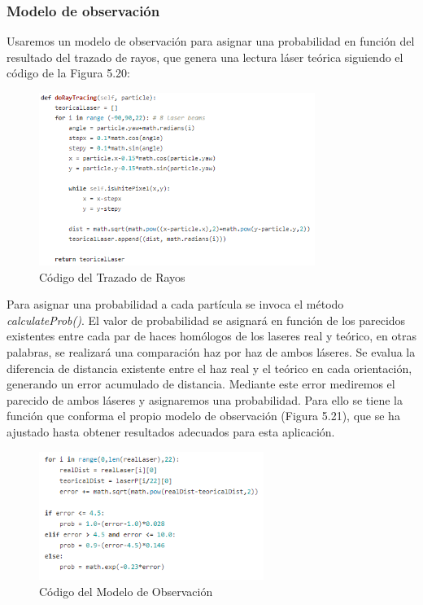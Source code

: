 \subsubsection{Modelo de observación}
Usaremos un modelo de observación para asignar una probabilidad en función del resultado del trazado de rayos, que genera una lectura láser teórica siguiendo el código de la Figura 5.20:

\begin{figure}[H]
\begin{center}
	\includegraphics[width=0.80\textwidth]{figures/doraytracing.png}
	\caption{Código del Trazado de Rayos}
	\label{fig.doraytracing}
	\end{center}
\end{figure}

Para asignar una probabilidad a cada partícula se invoca el método \textit{calculateProb()}. El valor de probabilidad se asignará en función de los parecidos existentes entre cada par de haces homólogos de los laseres real y teórico, en otras palabras, se realizará una comparación haz por haz de ambos láseres. Se evalua la diferencia de distancia existente entre el haz real y el teórico en cada orientación, generando un error acumulado de distancia. Mediante este error mediremos el parecido de ambos láseres y asignaremos una probabilidad. Para ello se tiene la función que conforma el propio modelo de observación (Figura 5.21), que se ha ajustado hasta obtener resultados adecuados para esta aplicación.

\begin{figure}[H]
\begin{center}
	\includegraphics[width=0.65\textwidth]{figures/codemodeloobservacion.png}
	\caption{Código del Modelo de Observación}
	\label{fig.codemodeloobservacion}
	\end{center}
\end{figure}   

